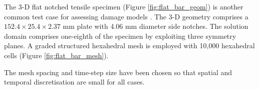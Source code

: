 \documentclass[sn-mathphys,Numbered]{sn-jnl}%
\begin{document}
The 3-D flat notched tensile specimen (Figure \ref{fig:flat_bar_geom}) is another common test case for assessing damage models \citep{borden_phase-field_2016, eldahshan_phase_2021}.
The 3-D geometry comprises a $152.4 \times 25.4 \times 2.37$ mm plate with 4.06 mm diameter side notches.
The solution domain comprises one-eighth of the specimen by exploiting three symmetry planes.
A graded structured hexahedral mesh is employed with 10,000 hexahedral cells (Figure \ref{fig:flat_bar_mesh}).

The mesh spacing and time-step size have been chosen so that spatial and temporal discretisation are small for all cases.

\end{document}
